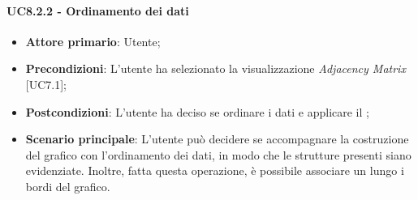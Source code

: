 \paragraph{UC8.2.2 - Ordinamento dei dati}
\begin{itemize}
	\item \textbf{Attore primario}: Utente;
	\item \textbf{Precondizioni}: L'utente ha selezionato la visualizzazione \textit{Adjacency Matrix} [UC7.1];
	\item \textbf{Postcondizioni}: L'utente ha deciso se ordinare i dati e applicare il ;
	
	\item \textbf{Scenario principale}: L'utente può decidere se accompagnare la costruzione del grafico con l'ordinamento dei dati, in modo che le strutture presenti siano evidenziate. Inoltre, fatta questa operazione, è possibile associare un  lungo i bordi del grafico.
\end{itemize}